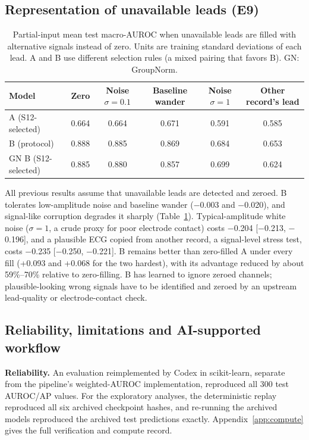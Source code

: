 \subsection{Representation of unavailable leads (E9)}
\label{sec:fill}

\begin{table}[htbp]
\centering\small
\caption{Partial-input mean test macro-AUROC when unavailable leads are filled with alternative signals instead of zero. Units are training standard deviations of each lead. A and B use different selection rules (a mixed pairing that favors B). GN: GroupNorm.}
\label{tab:fill}
\begin{tabular}{lccccc}
\toprule
Model & Zero & Noise $\sigma{=}0.1$ & Baseline wander & Noise $\sigma{=}1$ & Other record's lead \\
\midrule
A (S12-selected) & 0.664 & 0.664 & 0.671 & 0.591 & 0.585 \\
B (protocol) & 0.888 & 0.885 & 0.869 & 0.684 & 0.653 \\
GN B (S12-selected) & 0.885 & 0.880 & 0.857 & 0.699 & 0.624 \\
\bottomrule
\end{tabular}
\end{table}

All previous results assume that unavailable leads are detected and zeroed. B tolerates low-amplitude noise and baseline wander ($-$0.003 and $-$0.020), and signal-like corruption degrades it sharply (Table~\ref{tab:fill}). Typical-amplitude white noise ($\sigma=1$, a crude proxy for poor electrode contact) costs $-$0.204 [$-$0.213, $-$0.196], and a plausible ECG copied from another record, a signal-level stress test, costs $-$0.235 [$-$0.250, $-$0.221]. B remains better than zero-filled A under every fill (+0.093 and +0.068 for the two hardest), with its advantage reduced by about 59\%--70\% relative to zero-filling. B has learned to ignore zeroed channels; plausible-looking wrong signals have to be identified and zeroed by an upstream lead-quality or electrode-contact check.

\subsection{Reliability, limitations and AI-supported workflow}
\label{sec:limits}

\textbf{Reliability.} An evaluation reimplemented by Codex in scikit-learn, separate from the pipeline's weighted-AUROC implementation, reproduced all 300 test AUROC/AP values. For the exploratory analyses, the deterministic replay reproduced all six archived checkpoint hashes, and re-running the archived models reproduced the archived test predictions exactly. Appendix~\ref{app:compute} gives the full verification and compute record.

